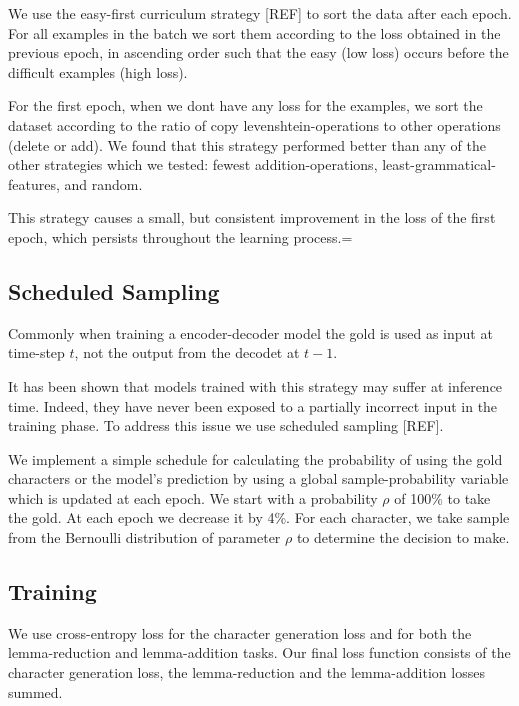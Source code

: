 \documentclass[11pt,a4paper]{article}
\begin{document}
We use the easy-first curriculum strategy [REF] to sort the data after
each epoch. For all examples in the batch we sort them according to
the loss obtained in the previous epoch, in ascending order such that the easy (low loss) occurs
before the difficult examples (high loss).  

For the first epoch, when we dont have any loss for the examples, we
sort the dataset according to the ratio of copy levenshtein-operations
to other operations (delete or add). We found that this strategy
performed better than any of the other strategies which we tested:
fewest addition-operations, least-grammatical-features, and random.

This strategy causes a small, but consistent improvement in the loss
of the first epoch, which persists throughout the learning process.=

\subsection{Scheduled Sampling}


Commonly when training a encoder-decoder model the gold is used as input at
time-step $t$, not the output from the decodet at $t-1$.

It has been shown that models trained with this strategy may suffer
at inference time. Indeed, they have never been exposed to a partially
incorrect input in the training phase.  To address this issue we use
scheduled sampling [REF].

We implement a simple schedule for calculating the probability of
using the gold characters or the model's prediction by using a global
sample-probability variable which is updated at each epoch. We start
with a probability \(\rho\) of 100\% to take the gold. At each epoch
we decrease it by 4\%. For each character, we take sample from the
Bernoulli distribution of parameter \(\rho\) to determine the
decision to make.

\subsection{Training}

We use cross-entropy loss for the character generation loss and 
for both the lemma-reduction and lemma-addition tasks. Our final loss
function consists of the character generation loss, the
lemma-reduction and the lemma-addition losses summed.
\end{document}
